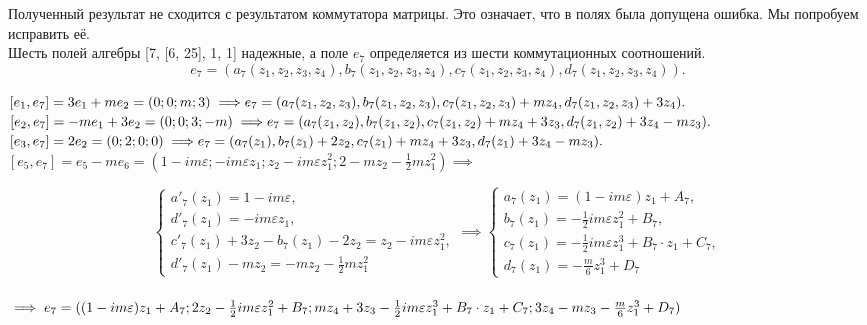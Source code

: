 \documentclass[12pt]{article}
\begin{document}
Полученный результат не сходится с результатом коммутатора матрицы. Это означает, что в полях была допущена ошибка. Мы попробуем исправить её. \\

Шесть полей алгебры [7, [6, 25], 1, 1] надежные, а поле $e_7$ определяется из шести коммутационных соотношений. 
$$e_7 = (a_7(z_1,z_2,z_3,z_4), b_7(z_1,z_2,z_3,z_4), c_7(z_1,z_2,z_3,z_4), d_7(z_1,z_2,z_3,z_4)).$$

$[e_1,e_7] = 3 e_1 + m  e_2 = (0;0;m;3) \implies \\
e_7 = (a_7(z_1,z_2,z_3), b_7(z_1,z_2,z_3), c_7(z_1,z_2,z_3) + m  z_4, d_7(z_1,z_2,z_3) + 3  z_4).$
\\

$[e_2,e_7] = -m  e_1 + 3  e_2 = (0;0;3;-m) \implies \\
e_7 = (a_7(z_1,z_2), b_7(z_1,z_2), c_7(z_1,z_2) + m  z_4 + 3 z_3, d_7(z_1,z_2) + 3  z_4 - m  z_3).$
\\

$[e_3,e_7] = 2  e_2 = (0;2;0;0) \implies \\
e_7 = (a_7(z_1), b_7(z_1) + 2  z_2, c_7(z_1) + m  z_4 + 3  z_3, d_7(z_1) + 3 z_4 - m z_3).$
\\

$[e_5,e_7] = e_5 - m e_6 = (1 - i m \varepsilon ; -  i m \varepsilon z_1; z_2 -  i m \varepsilon z_1^2;2 - m z_2 -  \frac{1}{2} m z_1^2 ) \implies$

\begin{equation*}
\begin{cases}
a'_7(z_1) = 1 - i m \varepsilon, \\
d'_7(z_1) = -  i m \varepsilon z_1, \\
c'_7(z_1) + 3 z_2 - b_7(z_1) - 2 z_2 = z_2 -  i m \varepsilon z_1^2, \\
d'_7(z_1) - m z_2 = - m z_2 -  \frac{1}{2} m z_1^2 
\end{cases}
\implies
\begin{cases}
a_7(z_1) = (1 - i m \varepsilon)z_1 + A_7, \\
b_7(z_1) =  - \frac{1}{2} i m \varepsilon z_1^2 + B_7, \\
c_7(z_1) = - \frac{1}{2} i m \varepsilon z_1^3 + B_7 \cdot z_1 + C_7, \\
d_7(z_1) = - \frac{m}{6} z_1^3 + D_7
\end{cases}
\end{equation*}\\
$\implies e_7 = ((1 - i m \varepsilon)z_1 + A_7;  2z_2 - \frac{1}{2} i m \varepsilon z_1^2 + B_7; \\
m z_4 + 3 z_3 - \frac{1}{2} i m \varepsilon z_1^3 + B_7 \cdot z_1 + C_7; 3 z_4 - m z_3 - \frac{m}{6} z_1^3 + D_7)$
\\
\end{document}

